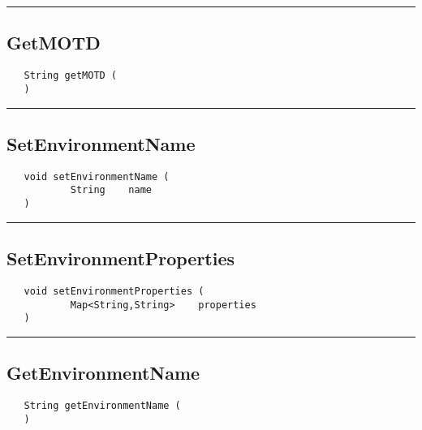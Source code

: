 \rule{15cm}{2pt}
\subsection{GetMOTD}
\label{Api:GetMOTD}
\begin{verbatim}
   String getMOTD (
   )
\end{verbatim}



\rule{15cm}{2pt}
\subsection{SetEnvironmentName}
\label{Api:SetEnvironmentName}
\begin{verbatim}
   void setEnvironmentName (
           String    name
   )
\end{verbatim}



\rule{15cm}{2pt}
\subsection{SetEnvironmentProperties}
\label{Api:SetEnvironmentProperties}
\begin{verbatim}
   void setEnvironmentProperties (
           Map<String,String>    properties
   )
\end{verbatim}



\rule{15cm}{2pt}
\subsection{GetEnvironmentName}
\label{Api:GetEnvironmentName}
\begin{verbatim}
   String getEnvironmentName (
   )
\end{verbatim}



